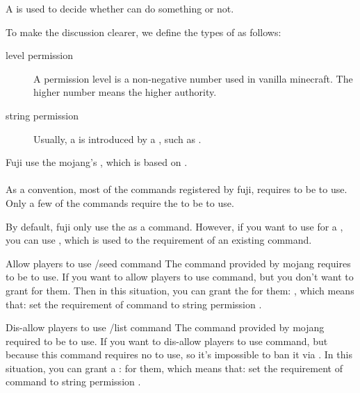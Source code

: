 \label{ch:permission}
A  is used to decide whether  can do something or not.


To make the discussion clearer, we define the types of  as follows:
\begin{description}
    \item [level permission] A permission level is a non-negative number used in vanilla minecraft.
    The higher number means the higher authority.
    \item[string permission] Usually, a  is introduced by a , such as .
\end{description}

\clearpage



Fuji use the mojang's , which is based on .\\
\\
As a convention, most of the commands registered by fuji, requires  to be  to use.
Only a few of the commands require the  to be  to use.

By default, fuji only use the  as  a command.
However, if you want to use  for a , you can use , which is used to  the requirement of an existing command.

\begin{example}{Allow players to use /seed command}
    The command  provided by mojang requires  to be  to use.
    If you want to allow players to use  command, but you don't want to grant  for them.
    Then in this situation, you can grant the  for them: , which means that: set the requirement of command  to string permission .
\end{example}

\begin{example}{Dis-allow players to use /list command}
    The command  provided by mojang required  to be  to use.
    If you want to dis-allow players to use  command, but because this command requires no  to use, so it's impossible to ban it via .
    In this situation, you can grant a :  for them, which means that: set the requirement of command  to string permission .
\end{example}


